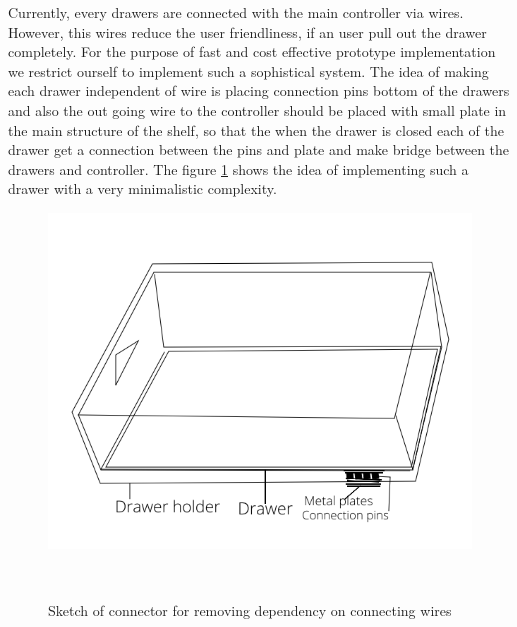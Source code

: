 Currently, every drawers are connected with the main controller via wires. However, this wires reduce the user friendliness, if an user pull out the drawer completely. For the purpose of fast and cost effective prototype implementation we restrict ourself to implement such a sophistical system. The idea of making each drawer independent of wire is placing connection pins bottom of the drawers and also the out going wire to the controller 
should be placed with small plate in the main structure of the shelf, so that the when the drawer is closed each of the drawer get a connection between the pins and plate and make bridge between the drawers and controller.
The figure \ref{fig:connector} shows the idea of implementing such a drawer with a very minimalistic complexity.
%
\begin{figure}
	\includegraphics[width=1\columnwidth]{figures/example_drawer}
	\caption{Sketch of connector for removing dependency on connecting wires}~\label{fig:connector}
\end{figure}
%